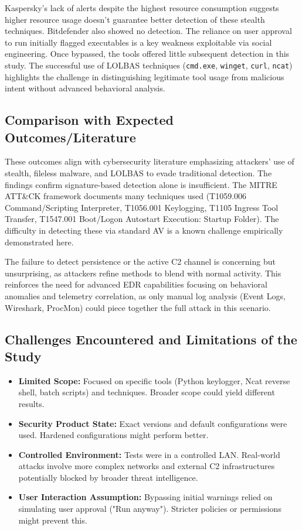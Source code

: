 \documentclass[11pt]{article}
\begin{document}
	Kaspersky's lack of alerts despite the highest resource consumption suggests higher resource usage doesn't guarantee better detection of these stealth techniques. Bitdefender also showed no detection. The reliance on user approval to run initially flagged executables is a key weakness exploitable via social engineering. Once bypassed, the tools offered little subsequent detection in this study. The successful use of LOLBAS techniques (\texttt{cmd.exe}, \texttt{winget}, \texttt{curl}, \texttt{ncat}) highlights the challenge in distinguishing legitimate tool usage from malicious intent without advanced behavioral analysis.
	
	\subsection{Comparison with Expected Outcomes/Literature}
	These outcomes align with cybersecurity literature emphasizing attackers' use of stealth, fileless malware, and LOLBAS to evade traditional detection. The findings confirm signature-based detection alone is insufficient. The MITRE ATT\&CK framework documents many techniques used (T1059.006 Command/Scripting Interpreter, T1056.001 Keylogging, T1105 Ingress Tool Transfer, T1547.001 Boot/Logon Autostart Execution: Startup Folder). The difficulty in detecting these via standard AV is a known challenge empirically demonstrated here.
	
	The failure to detect persistence or the active C2 channel is concerning but unsurprising, as attackers refine methods to blend with normal activity. This reinforces the need for advanced EDR capabilities focusing on behavioral anomalies and telemetry correlation, as only manual log analysis (Event Logs, Wireshark, ProcMon) could piece together the full attack in this scenario.
	
	\subsection{Challenges Encountered and Limitations of the Study}
	\begin{itemize}
		\item \textbf{Limited Scope:} Focused on specific tools (Python keylogger, Ncat reverse shell, batch scripts) and techniques. Broader scope could yield different results.
		\item \textbf{Security Product State:} Exact versions and default configurations were used. Hardened configurations might perform better.
		\item \textbf{Controlled Environment:} Tests were in a controlled LAN. Real-world attacks involve more complex networks and external C2 infrastructures potentially blocked by broader threat intelligence.
		\item \textbf{User Interaction Assumption:} Bypassing initial warnings relied on simulating user approval ("Run anyway"). Stricter policies or permissions might prevent this.
	\end{itemize}
	
\end{document}
